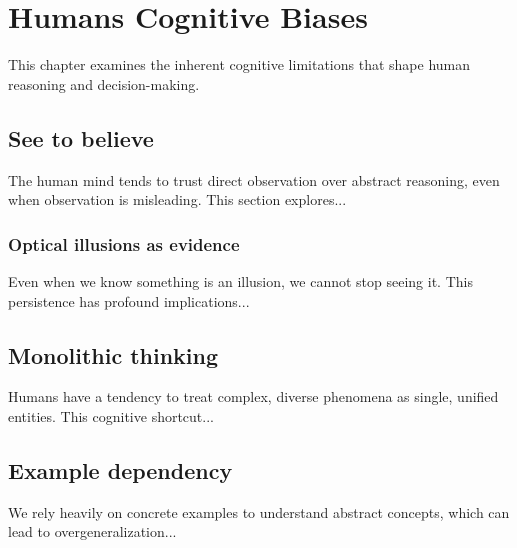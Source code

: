 \chapter{Humans Cognitive Biases}
\label{chap:cognitive-Biases}

This chapter examines the inherent cognitive limitations that shape human 
reasoning and decision-making.

\section{See to believe}
\label{sec:see-to-believe}

The human mind tends to trust direct observation over abstract reasoning, 
even when observation is misleading. This section explores...

\subsection{Optical illusions as evidence}
Even when we know something is an illusion, we cannot stop seeing it. 
This persistence has profound implications...

\section{Monolithic thinking}
\label{sec:monolithic}

Humans have a tendency to treat complex, diverse phenomena as single, 
unified entities. This cognitive shortcut...

\section{Example dependency}
\label{sec:example}

We rely heavily on concrete examples to understand abstract concepts, 
which can lead to overgeneralization...
